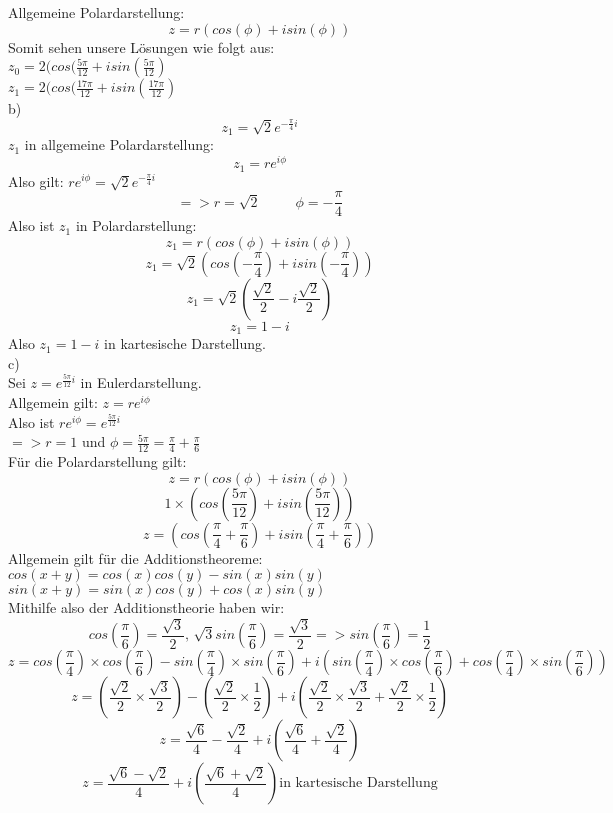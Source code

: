 \documentclass[11pt]{article}
\begin{document}
				Allgemeine Polardarstellung:\\
				$$z=r(cos(\phi)+isin(\phi))$$
				Somit sehen unsere Lösungen wie folgt aus:\\
				\indent $z_0=2(cos(\frac{5\pi}{12}+isin(\frac{5\pi}{12})$\\
				\indent $z_1=2(cos(\frac{17\pi}{12}+isin(\frac{17\pi}{12})$\\
			\indent b)\\
				$$z_1=\sqrt{2}e^{-\frac{\pi}{4}i}$$
				$z_1$ in allgemeine Polardarstellung:
				$$z_1=re^{i\phi}$$
				Also gilt: $re^{i\phi} = \sqrt{2}e^{-\frac{\pi}{4}i}$\\
				$$=> r=\sqrt{2} \hspace{30pt} \phi=-\frac{\pi}{4}$$
				Also ist $z_1$ in Polardarstellung:
				$$z_1=r(cos(\phi)+isin(\phi))$$
				$$z_1=\sqrt{2}(cos\left(-\frac{\pi}{4}\right)+isin\left(-\frac{\pi}{4}\right))$$
				$$z_1=\sqrt{2}\left(\frac{\sqrt{2}}{2}-i\frac{\sqrt{2}}{2}\right)$$
				$$z_1=1-i$$
				Also $z_1=1-i$ in kartesische Darstellung.\\
			\indent c)\\
				Sei $z=e^{\frac{5\pi}{12}i}$ in Eulerdarstellung.\\
				Allgemein gilt: $z=re^{i\phi}$\\
				Also ist $re^{i\phi}=e^{\frac{5\pi}{12}i}$\\
				$=> r=1$ und $\phi = \frac{5\pi}{12}=\frac{\pi}{4}+\frac{\pi}{6}$\\
				Für die Polardarstellung gilt:\\
				$$z=r(cos(\phi)+isin(\phi))$$
				$$1\times(cos\left(\frac{5\pi}{12}\right)+isin\left(\frac{5\pi}{12}\right))$$
				$$z=\left(cos\left(\frac{\pi}{4}+\frac{\pi}{6}\right)+isin\left(\frac{\pi}{4}+\frac{\pi}{6}\right)\right)$$
				Allgemein gilt für die Additionstheoreme:\\
				\indent $cos(x+y)=cos(x)cos(y)-sin(x)sin(y)$\\
				\indent $sin(x+y)=sin(x)cos(y)+cos(x)sin(y)$\\
				Mithilfe also der Additionstheorie haben wir:
				$$cos\left(\frac{\pi}{6}\right)=\frac{\sqrt{3}}{2} \mbox{, } \sqrt{3}sin\left(\frac{\pi}{6}\right)=\frac{\sqrt{3}}{2} => sin\left(\frac{\pi}{6}\right)=\frac{1}{2}$$
				$$z=cos\left(\frac{\pi}{4}\right)\times cos\left(\frac{\pi}{6}\right)-sin\left(\frac{\pi}{4}\right)\times sin\left(\frac{\pi}{6}\right)+i\left(sin\left(\frac{\pi}{4}\right)\times cos\left(\frac{\pi}{6}\right)+cos\left(\frac{\pi}{4}\right)\times sin\left(\frac{\pi}{6}\right)\right)$$
				$$z=\left(\frac{\sqrt{2}}{2}\times \frac{\sqrt{3}}{2}\right)-\left(\frac{\sqrt{2}}{2}\times \frac{1}{2}\right)+i\left(\frac{\sqrt{2}}{2}\times \frac{\sqrt{3}}{2}+\frac{\sqrt{2}}{2}\times \frac{1}{2}\right)$$
				$$z=\frac{\sqrt{6}}{4}-\frac{\sqrt{2}}{4}+i\left(\frac{\sqrt{6}}{4}+\frac{\sqrt{2}}{4}\right)$$
				$$z=\frac{\sqrt{6}-\sqrt{2}}{4}+i\left(\frac{\sqrt{6}+\sqrt{2}}{4}\right) \mbox{in kartesische Darstellung}$$
\end{document}
